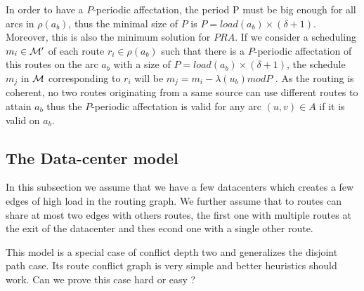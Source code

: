 \documentclass{article}
\begin{document}
In order to have a $P$-periodic affectation, the period P must be big enough for all arcs in $\rho(a_b)$, thus the minimal size of $P$ is $P= load(a_b) \times (\delta + 1)$. Moreover, this is also the minimum solution for $PRA$. If we consider a scheduling $m_i \in \cal M'$ of each route $r_i \in \rho(a_b)$ such that there is a $P$-periodic affectation of this routes on the arc $a_b$ with a size of $P =  load(a_b) \times (\delta + 1)$, the schedule $m_j$ in $\cal M$ corresponding to $r_i$ will be $m_j = m_i - \lambda(u_b) mod P$ . As the routing is coherent, no two routes originating from a same source can use different routes to attain $a_b$ thus the $P$-periodic affectation is valid for any arc $(u,v) \in A$ if it is valid on $a_b$.


\subsection{The Data-center model}

In this subsection we assume that we have a few datacenters which creates a few edges of high load
in the routing graph. We further assume that to routes can share at most two edges with others
routes, the first one with multiple routes at the exit of the datacenter and thes econd one 
with a single other route.

This model is a special case of conflict depth two and generalizes the disjoint path case.
Its route conflict graph is very simple and better heuristics should work. Can we prove this case
hard or easy ?
\end{document}
